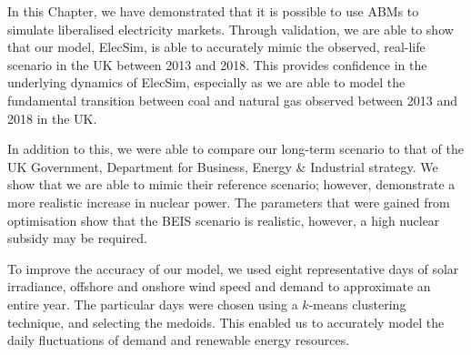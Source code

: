 








In this Chapter, we have demonstrated that it is possible to use ABMs to simulate liberalised electricity markets. Through validation, we are able to show that our model, ElecSim, is able to accurately mimic the observed, real-life scenario in the UK between 2013 and 2018. This provides confidence in the underlying dynamics of ElecSim, especially as we are able to model the fundamental transition between coal and natural gas observed between 2013 and 2018 in the UK.

In addition to this, we were able to compare our long-term scenario to that of the UK Government, Department for Business, Energy \& Industrial strategy. We show that we are able to mimic their reference scenario; however, demonstrate a more realistic increase in nuclear power. The parameters that were gained from optimisation show that the BEIS scenario is realistic, however, a high nuclear subsidy may be required.

To improve the accuracy of our model, we used eight representative days of solar irradiance, offshore and onshore wind speed and demand to approximate an entire year. The particular days were chosen using a $k$-means clustering technique, and selecting the medoids. This enabled us to accurately model the daily fluctuations of demand and renewable energy resources. 



